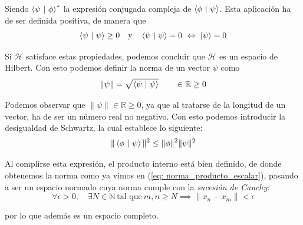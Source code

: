 \documentclass{article}
\numberwithin{equation}{section} %
\begin{document}
    \vspace{1.5mm}

    Siendo \( \braket{\psi \ | \ \phi}^{*} \) la expresión conjugada compleja de \( \braket{\phi \ | \ \psi} \). Esta aplicación ha de ser definida positiva, de manera que
    \begin{equation*}
        \braket{\psi \ | \ \psi} \geq 0 \quad \text{y} \quad \braket{\psi \ | \ \psi} = 0 \ \Leftrightarrow \ \ket{\psi} = 0
    \end{equation*}

    \vspace{1.5mm}

    Si \( \mathcal{H} \) satisface estas propiedades, podemos concluir que \( \mathcal{H} \) es un espacio de Hilbert. Con esto podemos definir la norma de un vector \( \psi \) como
    \begin{equation}
        \| \psi \| = \sqrt{\braket{\psi \ | \ \psi}} \qquad \in \mathbb{R} \geq 0
        \label{eq: norma_producto_escalar}
    \end{equation}

    \vspace{1.5mm}

    Podemos observar que \( \| \psi \| \in \mathbb{R} \geq 0 \), ya que al tratarse de la longitud de un vector, ha de ser un número real no negativo. Con esto podemos introducir la desigualdad de Schwartz, la cual establece lo siguiente:
    \begin{equation}
        \| \braket{\phi \ | \ \psi} \| ^{2} \leq \| \phi \| ^{2} \| \psi \|^{2}
        \label{eq: desigualdad_schwartz}
    \end{equation}

    \vspace{1.5mm}

    Al complirse esta expresión, el producto interno está bien definido, de donde obtenemos la norma como ya vimos en (\ref{eq: norma_producto_escalar}), pasando a ser un espacio normado cuya norma cumple con la \textit{sucesión de Cauchy}:
    \begin{equation*}
        \forall \epsilon > 0, \quad \exists N \in \mathbb{N} \ \text{tal que} \ m, n \geq N \implies \| x_{n} - x_{m} \| < \epsilon
    \end{equation*}
    
    \vspace{1.5mm}

    por lo que además es un espacio completo.

    \vspace{5mm}
\end{document}
